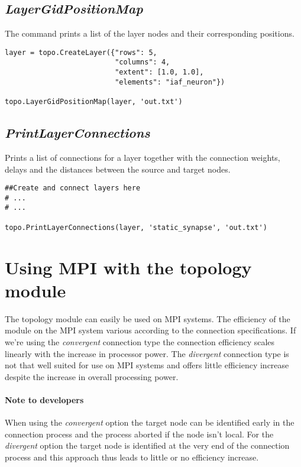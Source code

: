 \documentclass{article}
\begin{document}
\subsection{\emph{LayerGidPositionMap}}

The command prints a list of the layer nodes and their corresponding positions.

\begin{verbatim}
layer = topo.CreateLayer({"rows": 5, 
                          "columns": 4,
                          "extent": [1.0, 1.0],
                          "elements": "iaf_neuron"})

topo.LayerGidPositionMap(layer, 'out.txt')
\end{verbatim}

\subsection{\emph{PrintLayerConnections}}

Prints a list of connections for a layer together with the connection weights, delays and the distances between the source and target nodes.

\begin{verbatim}
##Create and connect layers here
# ... 
# ...

topo.PrintLayerConnections(layer, 'static_synapse', 'out.txt')
\end{verbatim}

\section{Using MPI with the topology module}

The topology module can easily be used on MPI systems. The efficiency of the module on the MPI system various according to the connection specifications. If we're using the \emph{convergent} connection type the connection efficiency scales linearly with the increase in processor power. The \emph{divergent} connection type is not that well suited for use on MPI systems and offers little efficiency increase despite the increase in overall processing power. 

\paragraph{Note to developers}

When using the \emph{convergent} option the target node can be identified early in the connection process and the process aborted if the node isn't local. For the \emph{divergent} option the target node is identified at the very end of the connection process and this approach thus leads to little or no efficiency increase.
\end{document}
